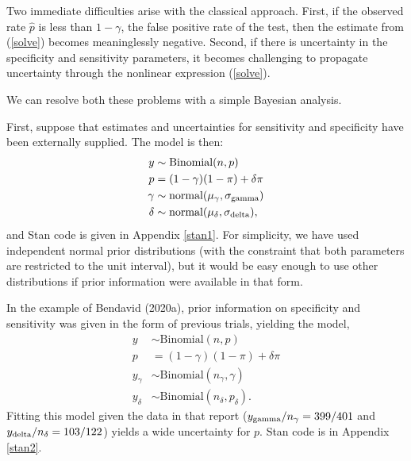 \documentclass[11pt]{article}
\begin{document}
 Two immediate difficulties arise with the classical approach.  First, if the observed rate $\hat{p}$ is less than  $1-\gamma$, the false positive rate of the test, then the estimate from (\ref{solve}) becomes meaninglessly negative.  Second, if there is uncertainty in the specificity and sensitivity parameters, it becomes challenging to propagate uncertainty through the nonlinear expression (\ref{solve}).

We can resolve both these problems with a simple Bayesian analysis.

First, suppose that estimates and uncertainties for sensitivity and specificity have been externally supplied.  The model is then:
\begin{align}
\nonumber  y & \sim \mbox{Binomial} (n, p)\\
\nonumber   p & = (1-\gamma)(1- \pi)+ \delta\pi\\
\nonumber  \gamma & \sim \mbox{normal}(\mu_{\gamma}, \sigma_{\rm gamma})\\
\label{normals}  \delta & \sim \mbox{normal}(\mu_{\delta}, \sigma_{\rm delta}),
\end{align}
and Stan code is given in Appendix \ref{stan1}.
For simplicity, we have used independent normal prior distributions (with the constraint that both parameters are restricted to the unit interval), but it would be easy enough to use other distributions if prior information were available in that form.

In the example of Bendavid (2020a), prior information on specificity and sensitivity was given in the form of previous trials, yielding the model,
  \begin{align*}
   y & \sim \mbox{Binomial} (n, p)\\
  p & = (1-\gamma)(1- \pi)+ \delta\pi\\
   y_{\gamma} & \sim \mbox{Binomial} (n_{\gamma}, \gamma)\\
   y_{\delta} & \sim \mbox{Binomial} (n_{\delta}, p_{\delta}).
 \end{align*}
 Fitting this model given the data in that report ($y_{\rm gamma}/n_{\gamma}=399/401$ and $y_{\rm delta}/n_{\delta}=103/122$) yields a wide uncertainty for $p$.  Stan code is in Appendix \ref{stan2}.
\end{document}

